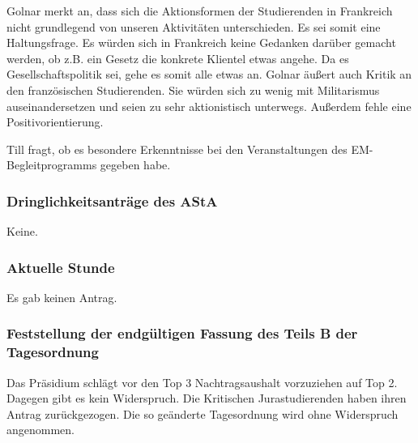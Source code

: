 \documentclass[ngerman,headheight=70pt]{scrartcl}
\begin{document}
    Golnar merkt an, dass sich die Aktionsformen der Studierenden in Frankreich
    nicht grundlegend von unseren Aktivitäten unterschieden. Es sei somit eine
    Haltungsfrage. Es würden sich in Frankreich keine Gedanken darüber gemacht
    werden, ob z.B. ein Gesetz die konkrete Klientel etwas angehe. Da es
    Gesellschaftspolitik sei, gehe es somit alle etwas an.
    Golnar äußert auch Kritik an den französischen Studierenden. Sie würden sich
    zu wenig mit Militarismus auseinandersetzen und seien zu sehr aktionistisch
    unterwegs. Außerdem fehle eine Positivorientierung.

    Till fragt, ob es besondere Erkenntnisse bei den Veranstaltungen des
    EM-Begleitprogramms gegeben habe.

    \subsubsection{Dringlichkeitsanträge des AStA}

    Keine.

    \subsubsection{Aktuelle Stunde}

    Es gab keinen Antrag.

    \subsubsection{Feststellung der endgültigen Fassung des Teils B der Tagesordnung}

    Das Präsidium schlägt vor den Top 3 Nachtragsaushalt vorzuziehen auf Top 2.
    Dagegen gibt es kein Widerspruch. Die Kritischen Jurastudierenden haben ihren
    Antrag zurückgezogen. Die so geänderte Tagesordnung wird ohne Widerspruch
    angenommen.
\end{document}
